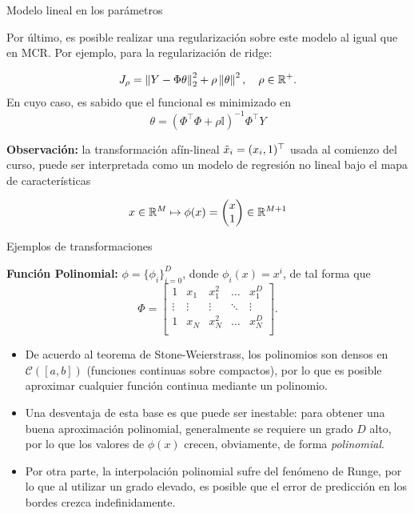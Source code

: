\documentclass[9pt]{beamer}
\begin{document}
\begin{frame}{Modelo lineal en los parámetros}

Por último, es posible realizar una regularización sobre este modelo al igual que en MCR. Por ejemplo, para la regularización de ridge:

\begin{equation*}
    J_\rho = \left\lVert Y-\Phi\theta\right\rVert_2^2 + \rho\left \| \theta \right \|^2,\quad \rho\in\mathbb{R}^+.
\end{equation*} \pause
En cuyo caso, es sabido que el funcional es minimizado en
\begin{equation*}
    \theta = (\Phi^\top\Phi+\rho\mathbb{I})^{-1}\Phi^\top Y
\end{equation*}\pause

\textbf{Observación:} la transformación afín-lineal $\tilde{x}_i=(x_i,1)^\top$ usada al comienzo del curso, puede ser interpretada como un modelo de regresión no lineal bajo el mapa  de características

\begin{equation*}
	x\in\mathbb{R}^M\mapsto \phi(x)=\left(\begin{matrix}
		x\\1
	\end{matrix}\right)\in\mathbb{R}^{M+1}
\end{equation*}

\end{frame}

\begin{frame}{Ejemplos de transformaciones}

\noindent\textbf{Función Polinomial:} $\phi=\{\phi_i\}_{i=0}^D$, donde $\phi_i(x)=x^i$, de tal forma que 
\begin{equation*}
    \Phi = \left[ \begin{matrix} 1 & x_1 & x_1^2 & \ldots & x_1^D\\
    \vdots & \vdots & \vdots & \ddots & \vdots \\
    1 & x_N & x_N^2 & \ldots & x_N^D\\
    \end{matrix} \right].
\end{equation*}\pause

\begin{itemize}
	\item De acuerdo al teorema de Stone-Weierstrass, los polinomios son densos en $\mathcal{C}([a,b])$ (funciones continuas sobre compactos), por lo que es posible aproximar cualquier función continua mediante un polinomio.\pause
	\item Una desventaja de esta  base es que puede ser inestable: para obtener una buena aproximación polinomial, generalmente se requiere un grado $D$  alto, por lo que los valores de $\phi(x)$ crecen, obviamente, de forma \emph{polinomial}.\pause
	\item Por otra parte, la interpolación polinomial sufre del fenómeno de Runge, por lo que al utilizar un grado elevado, es posible que el error de predicción en los bordes crezca indefinidamente.
\end{itemize}
	
\end{frame}
\end{document}

